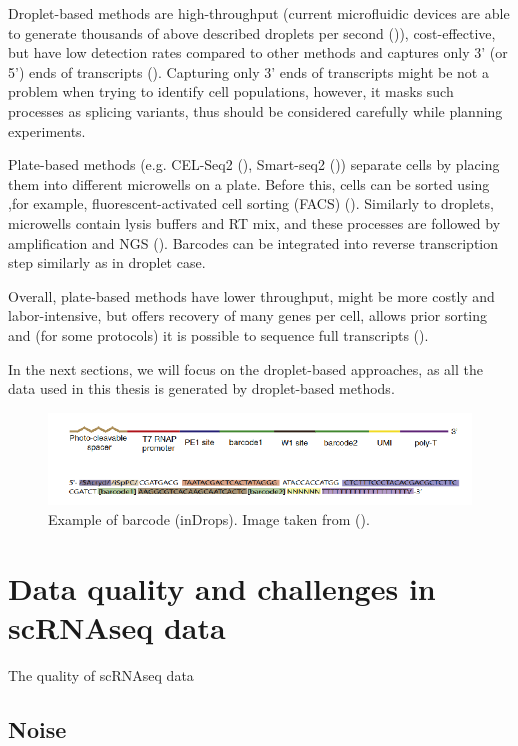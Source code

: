 Droplet-based methods are high-throughput
(current microfluidic devices are able to generate thousands of above described droplets per second (\cite{Prakadan2017})),
cost-effective, but have low detection rates compared to other methods and
captures only 3' (or 5') ends of transcripts (\cite{Heumos2023}).
Capturing only 3' ends of transcripts might be not a problem when trying to identify cell populations,
however, it masks such processes as splicing variants, thus should be considered carefully while planning experiments.

Plate-based methods (e.g. CEL-Seq2 (\cite{Hashimshony2016}), Smart-seq2 (\cite{Picelli2013}))
separate cells by placing them into different microwells on a plate.
Before this, cells can be sorted using ,for example, fluorescent-activated cell sorting (FACS) (\cite{Heumos2023}).
Similarly to droplets, microwells contain lysis buffers and RT mix,
and these processes are followed by amplification and NGS (\cite{Hashimshony2016}).
Barcodes can be integrated into reverse transcription step similarly as in droplet case.

Overall, plate-based methods have lower throughput, might be more costly and labor-intensive,
but offers recovery of many genes per cell, allows prior sorting and
(for some protocols) it is possible to sequence full transcripts (\cite{Heumos2023}).

In the next sections, we will focus on the droplet-based approaches,
as all the data used in this thesis is generated by droplet-based methods.

\begin{figure}
  \centering
  \includegraphics[width=\linewidth]{images/primer.png}
  \caption{Example of barcode (inDrops). Image taken from (\cite{Klein2015}).}
  \label{fig:primer}
\end{figure}

\section{Data quality and challenges in scRNAseq data}

The quality of scRNAseq data

\subsection{Noise}

